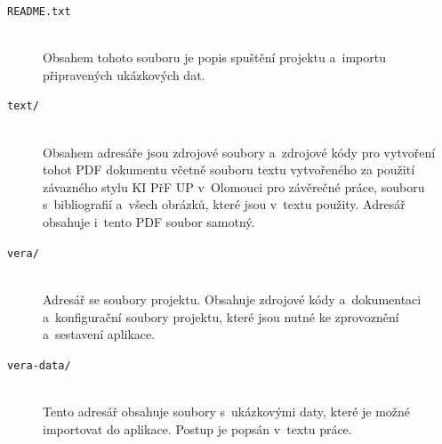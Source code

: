 \documentclass[
  tables=false,
  glossaries,
  index
]{kidiplom}
\begin{document}
\begin{description}

	\item[\texttt{README.txt}] \hfill \\
		Obsahem tohoto souboru je popis spuštění projektu a~importu připravených ukázkových dat.

	\item[\texttt{text/}] \hfill \\
	    Obsahem adresáře jsou zdrojové soubory a~zdrojové kódy pro vytvoření tohot PDF dokumentu včetně souboru textu vytvořeného za použití závazného stylu KI PřF UP v~Olomouci pro závěrečné práce, souboru s~bibliografií a~všech obrázků, které jsou v~textu použity. Adresář obsahuje i~tento PDF soubor samotný.

	\item[\texttt{vera/}] \hfill \\
		Adresář se soubory projektu. Obsahuje zdrojové kódy a~dokumentaci a~konfigurační soubory projektu, které jsou nutné ke zprovoznění a~sestavení aplikace.

	\item[\texttt{vera-data/}] \hfill \\
		Tento adresář obsahuje soubory s~ukázkovými daty, které je možné importovat do aplikace. Postup je popsán v~textu práce.

\end{description}




\nocite{*}

\printindex

\printbibliography
\end{document}
